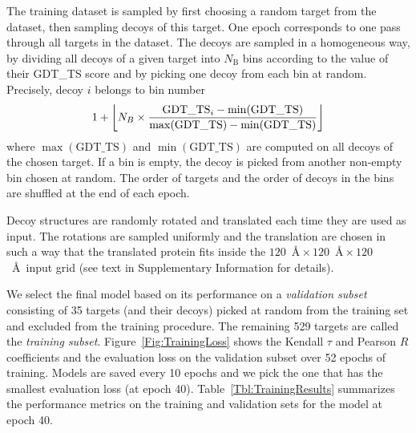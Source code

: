 \documentclass{bioinfo}
\DeclarePairedDelimiter\floor{\lfloor}{\rfloor}
\begin{document}
The training dataset is sampled by first choosing a random target from
the dataset, then sampling decoys of this target. One epoch
corresponds to one pass through all targets in the dataset. The decoys
are sampled in a homogeneous way, by dividing all decoys of a given
target into $N_\text{B}$ bins according to the value of their GDT\_TS score
and by picking one decoy from each bin at random.
Precisely, decoy $i$ belongs to bin number 
\begin{equation}
1 + \floor*{ N_B \times \frac{\text{GDT\_TS}_i - \min(\text{GDT\_TS}) }{\max(\text{GDT\_TS}) - \min(\text{GDT\_TS})} }
\end{equation}
where $\max(\text{GDT\_TS})$ and $\min(\text{GDT\_TS})$ are computed
on all decoys of the chosen target.  If a bin
is empty, the decoy is picked from another non-empty bin chosen at
random.  The order of targets and the order of decoys in the bins are
shuffled at the end of each epoch.

Decoy structures are randomly rotated and translated each time they
are used as input. The rotations are sampled uniformly
\citep{shoemake1992uniform} and the translation are chosen in such a
way that the translated protein fits inside the $120$~\AA${}\times
120$~\AA${}\times 120$~\AA\ input grid (see text in Supplementary
Information for details).

We select the final model based on its performance on a
\emph{validation subset} consisting of 35 targets (and their decoys)
picked at random from the training set and excluded from the training
procedure. The remaining 529 targets are called the \emph{training
subset}.  Figure~\ref{Fig:TrainingLoss} shows the Kendall $\tau$ and
Pearson $R$ coefficients and the evaluation loss on the validation subset over 52
epochs of training.  Models are saved every 10 epochs and we pick the
one that has the smallest evaluation loss (at epoch 40).
Table~\ref{Tbl:TrainingResults} summarizes the performance metrics on
the training and validation sets for the model at epoch 40.
\end{document}

